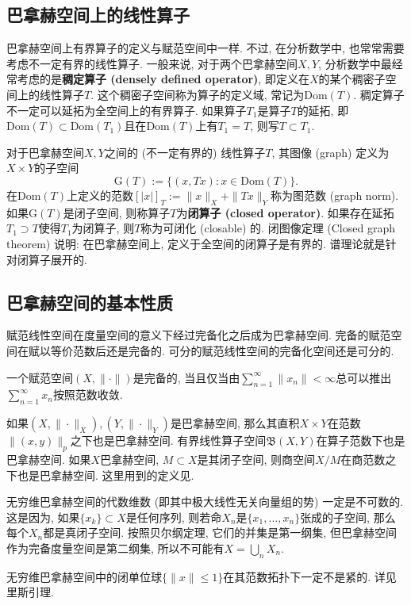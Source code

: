 \subsection{巴拿赫空间上的线性算子}
巴拿赫空间上有界算子的定义与赋范空间中一样. 不过, 在分析数学中, 也常常需要考虑不一定有界的线性算子. 一般来说, 对于两个巴拿赫空间$X,Y$, 分析数学中最经常考虑的是\textbf{稠定算子 (densely defined operator)}, 即定义在$X$的某个稠密子空间上的线性算子$T$. 这个稠密子空间称为算子的定义域, 常记为$\text{Dom}(T)$. 稠定算子不一定可以延拓为全空间上的有界算子. 如果算子$T_1$是算子$T$的延拓, 即$\text{Dom}(T)\subset \text{Dom}(T_1)$且在$\text{Dom}(T)$上有$T_1=T$, 则写$T\subset T_1$.

对于巴拿赫空间$X,Y$之间的 (不一定有界的) 线性算子$T$, 其图像 (graph) 定义为$X\times Y$的子空间
$$
\text{G}(T):=\{(x,Tx):x\in \text{Dom}(T)\}.
$$
在$\text{Dom}(T)$上定义的范数$[|x|]_T:=\|x\|_X+\|Tx\|_Y$称为图范数 (graph norm). 如果$\text{G}(T)$是闭子空间, 则称算子$T$为\textbf{闭算子 (closed operator)}. 如果存在延拓$T_1\supset T$使得$T_1$为闭算子, 则$T$称为可闭化 (closable) 的. 闭图像定理 (Closed graph theorem) 说明: 在巴拿赫空间上, 定义于全空间的闭算子是有界的. 谱理论就是针对闭算子展开的.

\subsection{巴拿赫空间的基本性质}
赋范线性空间在度量空间的意义下经过完备化之后成为巴拿赫空间. 完备的赋范空间在赋以等价范数后还是完备的. 可分的赋范线性空间的完备化空间还是可分的. 

一个赋范空间$(X,\|\cdot\|)$是完备的, 当且仅当由$\sum _{n=1}^{\infty }\|x_{n}\|<\infty $总可以推出$\sum _{n=1}^{\infty }x_{n}$按照范数收敛.

如果$(X,\|\cdot\|_X),(Y,\|\cdot\|_Y)$是巴拿赫空间, 那么其直积$X\times Y$在范数$\|(x,y)\|_{p}$之下也是巴拿赫空间. 有界线性算子空间$\mathfrak{B}(X,Y)$在算子范数下也是巴拿赫空间. 如果$X$巴拿赫空间, $M\subset X$是其闭子空间, 则商空间$X/M$在商范数之下也是巴拿赫空间. 这里用到的定义见.

无穷维巴拿赫空间的代数维数 (即其中极大线性无关向量组的势) 一定是不可数的. 这是因为, 如果$\{x_k\}\subset X$是任何序列, 则若命$X_n$是$\{x_1,...,x_n\}$张成的子空间, 那么每个$X_n$都是真闭子空间. 按照贝尔纲定理, 它们的并集是第一纲集, 但巴拿赫空间作为完备度量空间是第二纲集, 所以不可能有$X=\bigcup_n X_n$.

无穷维巴拿赫空间中的闭单位球$\{\|x\|\leq1\}$在其范数拓扑下一定不是紧的. 详见里斯引理.
